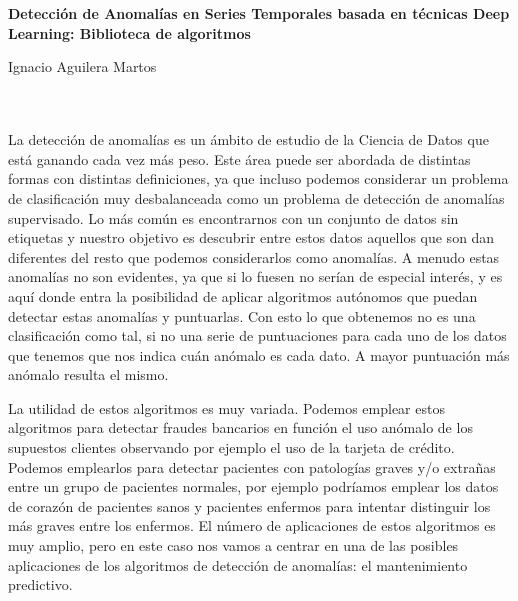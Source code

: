 \chapter*{}






\cleardoublepage
\thispagestyle{empty}

\begin{center}
{\large\bfseries Detección de Anomalías en Series Temporales basada en técnicas Deep Learning: Biblioteca de algoritmos}\\
\end{center}
\begin{center}
Ignacio Aguilera Martos\\
\end{center}

\\

\vspace{0.7cm}
\\

La detección de anomalías es un ámbito de estudio de la Ciencia de Datos que está ganando cada vez más peso. Este área puede ser abordada de distintas formas con distintas definiciones, ya que incluso podemos considerar un problema de clasificación muy desbalanceada como un problema de detección de anomalías supervisado. Lo más común es encontrarnos con un conjunto de datos sin etiquetas y nuestro objetivo es descubrir entre estos datos aquellos que son dan diferentes del resto que podemos considerarlos como anomalías. A menudo estas anomalías no son evidentes, ya que si lo fuesen no serían de especial interés, y es aquí donde entra la posibilidad de aplicar algoritmos autónomos que puedan detectar estas anomalías y puntuarlas. Con esto lo que obtenemos no es una clasificación como tal, si no una serie de puntuaciones para cada uno de los datos que tenemos que nos indica cuán anómalo es cada dato. A mayor puntuación más anómalo resulta el mismo.

La utilidad de estos algoritmos es muy variada. Podemos emplear estos algoritmos para detectar fraudes bancarios en función el uso anómalo de los supuestos clientes observando por ejemplo el uso de la tarjeta de crédito. Podemos emplearlos para detectar pacientes con patologías graves y/o extrañas entre un grupo de pacientes normales, por ejemplo podríamos emplear los datos de corazón de pacientes sanos y pacientes enfermos para intentar distinguir los más graves entre los enfermos. El número de aplicaciones de estos algoritmos es muy amplio, pero en este caso nos vamos a centrar en una de las posibles aplicaciones de los algoritmos de detección de anomalías: el mantenimiento predictivo.

